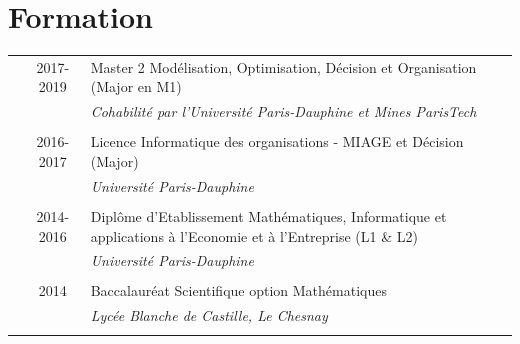 \documentclass[a4paper,10pt]{article}
\begin{document}
\section{Formation}
\begin{tabular}{p{0.4cm} c|p{12.5cm}}
 & \textsc{2017-2019} & Master 2 Modélisation, Optimisation, Décision et Organisation (Major en M1)\\&&\emph{\small{Cohabilité par l'Université Paris-Dauphine et Mines ParisTech}}\\\multicolumn{2}{c}{} \\
 & \textsc{2016-2017} & Licence Informatique des organisations - MIAGE et Décision (Major)\\&&\emph{\small{Université Paris-Dauphine}}\\\multicolumn{2}{c}{} \\
 & \textsc{2014-2016} & Diplôme d'Etablissement Mathématiques, Informatique et applications à l'Economie et à l'Entreprise (L1 \& L2) \\&&\emph{\small{Université Paris-Dauphine}}\\\multicolumn{2}{c}{} \\
 &\textsc{2014} & Baccalauréat Scientifique option Mathématiques \\&&\emph{\small{Lycée Blanche de Castille, Le Chesnay}}\\\\
\end{tabular}
\titlespacing{\section}{0pt}{2pt}{2pt}
\end{document}
